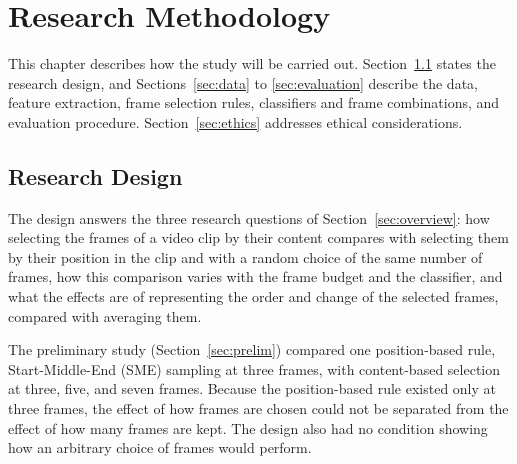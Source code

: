 %
%
%

\chapter{Research Methodology}
\label{sec:methodology}

This chapter describes how the study will be carried out. Section~\ref{sec:design} states the research design, and Sections~\ref{sec:data} to \ref{sec:evaluation} describe the data, feature extraction, frame selection rules, classifiers and frame combinations, and evaluation procedure. Section~\ref{sec:ethics} addresses ethical considerations.



\section{Research Design}
\label{sec:design}

The design answers the three research questions of Section~\ref{sec:overview}: how selecting the frames of a video clip by their content compares with selecting them by their position in the clip and with a random choice of the same number of frames, how this comparison varies with the frame budget and the classifier, and what the effects are of representing the order and change of the selected frames, compared with averaging them.

The preliminary study (Section~\ref{sec:prelim}) compared one position-based rule, Start-Middle-End (SME) sampling at three frames, with content-based selection at three, five, and seven frames. Because the position-based rule existed only at three frames, the effect of how frames are chosen could not be separated from the effect of how many frames are kept. The design also had no condition showing how an arbitrary choice of frames would perform.

